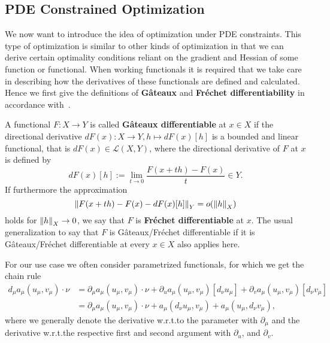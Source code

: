 \subsection{PDE Constrained Optimization}

We now want to introduce the idea of optimization under PDE constraints.
This type of optimization is similar to other kinds of optimization in that we can derive certain optimality conditions reliant on the gradient and Hessian of some function or functional.
When working functionals it is required that we take care in describing how the derivatives of these functionals are defined and calculated.
Hence we first give the definitions of \textbf{G\^{a}teaux} and \textbf{Fr\'{e}chet differentiability} in accordance with~\cite[Section 1.4]{Hinze2009}.

A functional $F: X \rightarrow Y$ is called \textbf{G\^{a}teaux differentiable} at $x \in X$ if the directional derivative $dF(x): X \rightarrow Y, h \mapsto dF (x) [ h ]$ is a bounded and linear functional, that is $dF(x) \in \mathcal{L}(X, Y)$, where the directional derivative of $F$ at $x$ is defined by
\begin{equation*}\label{DirDeriv}
    dF(x)[h] := \lim\limits_{t \rightarrow 0} \frac{F(x + th) - F(x)}{t} \in Y.
\end{equation*}
If furthermore the approximation
\begin{equation*}\label{FrechDeriv}
    \norm[Y]{F(x + th) - F(x) - dF(x)[h]} = o(\norm[X]{h})
\end{equation*}
holds for $\norm[X]{h} \rightarrow 0$, we say that $F$ is \textbf{Fr\'{e}chet differentiable} at $x$.
The usual generalization to say that $F$ is G\^{a}teaux/Fr\'{e}chet differentiable if it is G\^{a}teaux/Fr\'{e}chet differentiable at every $x \in X$ also applies here.

For our use case we often consider parametrized functionals, for which we get the chain rule
\begin{align*}
    d_\mu a_\mu(u_\mu, v_\mu) \cdot \nu &= \partial_\mu a_\mu(u_\mu, v_\mu) \cdot \nu + \partial_u a_\mu(u_\mu, v_\mu)[d_\nu u_\mu] + \partial_v a_\mu(u_\mu, v_\mu)[d_\nu v_\mu] \\
    &= \partial_\mu a_\mu(u_\mu, v_\mu) \cdot \nu + a_\mu(d_\nu u_\mu, v_\mu) + a_\mu(u_\mu, d_\nu v_\mu),
\end{align*}
where we generally denote the derivative w.r.t.\@ to the parameter with $\partial_\mu$ and the derivative w.r.t.\@ the respective first and second argument with $\partial_u$, and $\partial_v$.

